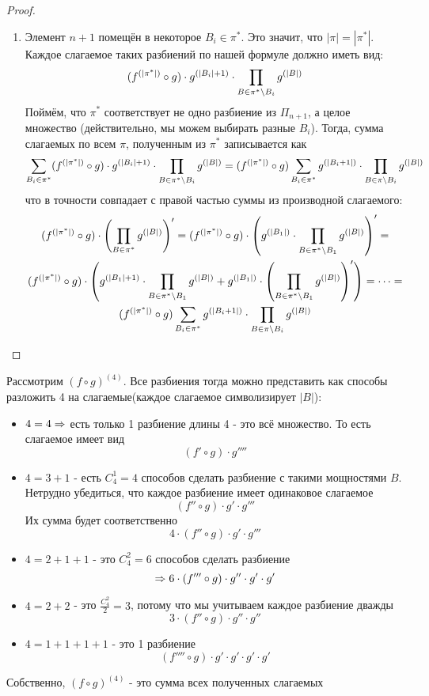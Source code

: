 \begin{proof}
\begin{itemize}
\begin{enumerate}
			\item Элемент $n + 1$ помещён в некоторое $B_i \in \pi^*$. Это значит, что $|\pi| = |\pi^*|$. Каждое слагаемое таких разбиений по нашей формуле должно иметь вид:
			\[
				(f^{(|\pi^*|)} \circ g) \cdot g^{(|B_i| + 1)} \cdot \prod\limits_{B \in \pi^* \backslash B_i} g^{(|B|)}
			\]
			Поймём, что $\pi^*$ соответствует не одно разбиение из $\Pi_{n + 1}$, а целое множество (действительно, мы можем выбирать разные $B_i$). Тогда, сумма слагаемых по всем $\pi$, полученным из $\pi^*$ записывается как
			\[
				\sum\limits_{B_i \in \pi^*} (f^{(|\pi^*|)} \circ g) \cdot g^{(|B_i| + 1)} \cdot \prod\limits_{B \in \pi^* \backslash B_i} g^{(|B|)} = (f^{(|\pi^*|)} \circ g) \sum\limits_{B_i \in \pi^*} g^{(|B_i + 1|)} \cdot \prod\limits_{B \in \pi \backslash B_i} g^{(|B|)}
			\]
			что в точности совпадает с правой частью суммы из производной слагаемого:
			\begin{multline*}
				(f^{(|\pi^*|)} \circ g) \cdot \left(\prod\limits_{B \in \pi^*} g^{(|B|)}\right)' = (f^{(|\pi^*|)} \circ g) \cdot \left(g^{(|B_1|)} \cdot \prod\limits_{B \in \pi^* \backslash B_1} g^{(|B|)}\right)' = \\
				(f^{(|\pi^*|)} \circ g) \cdot \left(g^{(|B_1| + 1)} \cdot \prod\limits_{B \in \pi^* \backslash B_1} g^{(|B|)} + g^{(|B_1|)} \cdot \left(\prod\limits_{B \in \pi^* \backslash B_1} g^{(|B|)}\right)'\right) = \dots = \\
				(f^{(|\pi^*|)} \circ g) \sum\limits_{B_i \in \pi^*} g^{(|B_i + 1|)} \cdot \prod\limits_{B \in \pi \backslash B_i} g^{(|B|)}
			\end{multline*}
		\end{enumerate}
	\end{itemize}
\end{proof}

\begin{example}
	Рассмотрим $(f \circ g)^{(4)}$. Все разбиения тогда можно представить как способы разложить 4 на слагаемые(каждое слагаемое символизирует $|B|$):
	\begin{itemize}
		\item $4 = 4 \Rightarrow$ есть только 1 разбиение длины 4 - это всё множество. То есть слагаемое имеет вид
		\[
			\left(f' \circ g\right) \cdot g''''
		\]
		\item $4 = 3 + 1$ - есть $C_4^1 = 4$ способов сделать разбиение с такими мощностями $B$. Нетрудно убедиться, что каждое разбиение имеет одинаковое слагаемое
		\[
			\left(f'' \circ g\right) \cdot g' \cdot g'''
		\]
		Их сумма будет соответственно
		\[
			4 \cdot \left(f'' \circ g\right) \cdot g' \cdot g'''
		\]
		\item $4 = 2 + 1 + 1$ - это $C_4^2 = 6$ способов сделать разбиение
		\[
			\Rightarrow 6 \cdot \left(f''' \circ g\right) \cdot g'' \cdot g' \cdot g'
		\]
		\item $4 = 2 + 2$ - это $\frac{C_4^2}{2} = 3$, потому что мы учитываем каждое разбиение дважды
		\[
			3 \cdot \left(f'' \circ g\right) \cdot g'' \cdot g''
		\]
		\item $4 = 1 + 1 + 1 + 1$ - это 1 разбиение
		\[
			\left(f'''' \circ g\right) \cdot g' \cdot g' \cdot g' \cdot g'
		\]
	\end{itemize}
	Собственно, $(f \circ g)^{(4)}$ - это сумма всех полученных слагаемых
\end{example}

